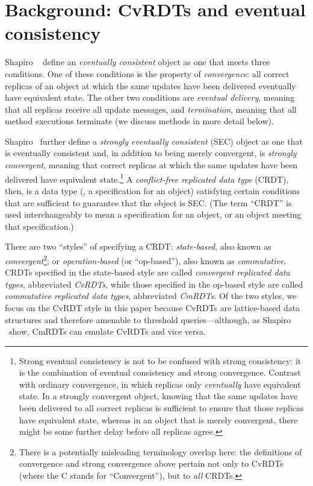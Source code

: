 \section{Background: CvRDTs and eventual consistency}\label{s:distributed-cvrdts}

Shapiro \etal~\cite{crdts, crdts-tr} define an \emph{eventually
  consistent} object as one that meets three conditions.  One of these
conditions is the property of \emph{convergence}: all correct replicas
of an object at which the same updates have been delivered eventually
have equivalent state.  The other two conditions are \emph{eventual
  delivery}, meaning that all replicas receive all update messages,
and \emph{termination}, meaning that all method executions terminate
(we discuss methods in more detail below).

Shapiro \etal~further define a \emph{strongly eventually consistent}
(SEC) object as one that is eventually consistent and, in addition to
being merely convergent, is \emph{strongly convergent}, meaning that
correct replicas at which the same updates have been delivered have
equivalent state.\footnote{ Strong eventual consistency is not to be
  confused with strong consistency: it is the combination of eventual
  consistency and strong convergence.  Contrast with ordinary
  convergence, in which replicas only \emph{eventually} have
  equivalent state.  In a strongly convergent object, knowing that the
  same updates have been delivered to all correct replicas is
  sufficient to ensure that those replicas have equivalent state,
  whereas in an object that is merely convergent, there might be some
  further delay before all replicas agree.}  A \emph{conflict-free
  replicated data type} (CRDT), then, is a data type (\ie, a
specification for an object) satisfying certain conditions that are
sufficient to guarantee that the object is SEC.  (The term ``CRDT'' is
used interchangeably to mean a specification for an object, or an
object meeting that specification.)

There are two ``styles'' of specifying a CRDT: \emph{state-based},
also known as \emph{convergent}\footnote{There is a potentially
  misleading terminology overlap here: the definitions of convergence
  and strong convergence above pertain not only to CvRDTs (where the C
  stands for ``Convergent''), but to \emph{all} CRDTs.}; or
\emph{operation-based} (or ``op-based''), also known as
\emph{commutative}.  CRDTs specified in the state-based style are
called \emph{convergent replicated data types}, abbreviated
\emph{CvRDTs}, while those specified in the op-based style are called
\emph{commutative replicated data types}, abbreviated \emph{CmRDTs}.
Of the two styles, we focus on the CvRDT style in this paper because
CvRDTs are lattice-based data structures and therefore amenable to
threshold queries---although, as Shapiro \etal~show, CmRDTs can
emulate CvRDTs and vice versa.

